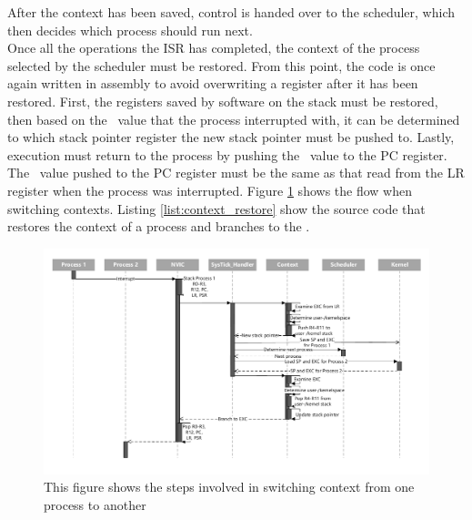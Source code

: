 After the context has been saved, control is handed over to the scheduler, which
then decides which process should run next.\\
Once all the operations the ISR has completed, the context of the process
selected by the scheduler must be restored. From this point, the code is once
again written in assembly to avoid overwriting a register after it has been
restored. First, the registers saved by software on the stack must be restored,
then based on the \excreturn\ value that the process interrupted with, it can be
determined to which stack pointer register the new stack pointer must be pushed
to. Lastly, execution must return to the process by pushing the \excreturn\ value
to the PC register. The \excreturn\ value pushed to the PC register must be the
same as that read from the LR register when the process was interrupted.
Figure \ref{fig:scheduling_sequence_diagram} shows the flow when switching contexts.
Listing \ref{list:context_restore} show the source code that restores the
context of a process and branches to the \excreturn .
\begin{figure}[H]
	\centerline{\includegraphics[width=\paperwidth-2cm,]{figures/scheduling_sequence_diagram.pdf}}
    \caption{This figure shows the steps involved in switching context from one
	process to another}
    \label{fig:scheduling_sequence_diagram}
\end{figure}

